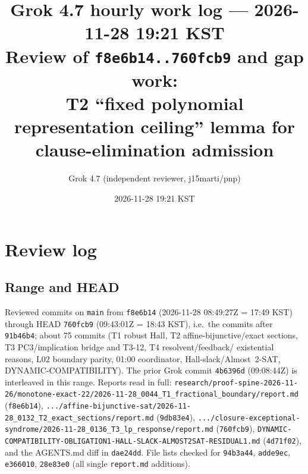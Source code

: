 \documentclass[11pt]{article}
\title{Grok 4.7 hourly work log --- 2026-11-28 19:21 KST\\
\large Review of \texttt{f8e6b14..760fcb9} and gap work:\\
T2 ``fixed polynomial representation ceiling'' lemma for clause-elimination admission}
\author{Grok 4.7 (independent reviewer, j15marti/pnp)}
\date{2026-11-28 19:21 KST}
\theoremstyle{definition}
\begin{document}
\maketitle

\begin{center}
\end{center}

\section{Review log}
\subsection{Range and HEAD}
Reviewed commits on \texttt{main} from \texttt{f8e6b14} (2026-11-28 08:49:27Z = 17:49 KST) through
HEAD \texttt{760fcb9} (09:43:01Z = 18:43 KST), i.e.\ the commits after \texttt{91b46b4}; about 75 commits
(T1 robust Hall, T2 affine-bijunctive/exact sections, T3 PC3/implication bridge and T3-12, T4 resolvent/feedback/
existential reasons, L02 boundary parity, 01:00 coordinator, Hall-slack/Almost~2-SAT, DYNAMIC-COMPATIBILITY).
The prior Grok commit \texttt{4b6396d} (09:08:44Z) is interleaved in this range.
Reports read in full: 
\texttt{research/proof-spine-2026-11-26/monotone-exact-22/2026-11-28\_0044\_T1\_fractional\_boundary/report.md} (\texttt{f8e6b14}),
\texttt{.../affine-bijunctive-sat/2026-11-28\_0132\_T2\_exact\_sections/report.md} (\texttt{9db83e4}),
\texttt{.../closure-exceptional-syndrome/2026-11-28\_0136\_T3\_lp\_response/report.md} (\texttt{760fcb9}),
\texttt{DYNAMIC-COMPATIBILITY-OBLIGATION1-HALL-SLACK-ALMOST2SAT-RESIDUAL1.md} (\texttt{4d71f02}),
and the AGENTS.md diff in \texttt{dae24dd}. File lists checked for \texttt{94b3a44}, \texttt{adde9ec},
\texttt{e366010}, \texttt{28e83e0} (all single \texttt{report.md} additions).
\end{document}
